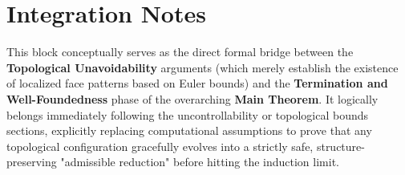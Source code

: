 \documentclass[12pt]{article}
\begin{document}
\section*{Integration Notes}
This block conceptually serves as the direct formal bridge between the \textbf{Topological Unavoidability} arguments (which merely establish the existence of localized face patterns based on Euler bounds) and the \textbf{Termination and Well-Foundedness} phase of the overarching \textbf{Main Theorem}. It logically belongs immediately following the uncontrollability or topological bounds sections, explicitly replacing computational assumptions to prove that any topological configuration gracefully evolves into a strictly safe, structure-preserving "admissible reduction" before hitting the induction limit.
\end{document}
